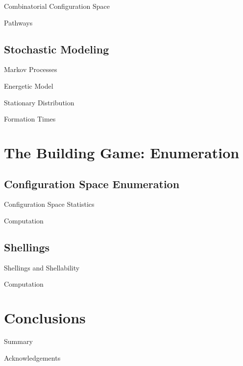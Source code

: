 \documentclass{beamer}
\begin{document}
\begin{frame}{Combinatorial Configuration Space}
\end{frame}

\begin{frame}{Pathways}
\end{frame}

\subsection{Stochastic Modeling} 
\begin{frame}{Markov Processes}
\end{frame}

\begin{frame}{Energetic Model}
\end{frame}

\begin{frame}{Stationary Distribution}
\end{frame}

\begin{frame}{Formation Times}
\end{frame}

\section{The Building Game: Enumeration}
\subsection{Configuration Space Enumeration}
\begin{frame}{Configuration Space Statistics}
\end{frame}

\begin{frame}{Computation}
\end{frame}

\subsection{Shellings}
\begin{frame}{Shellings and Shellability}
\end{frame}
\begin{frame}{Computation}
\end{frame}

\section{Conclusions}
\begin{frame}{Summary}
\end{frame}
\begin{frame}{Acknowledgements}
\end{frame}
\end{document}
